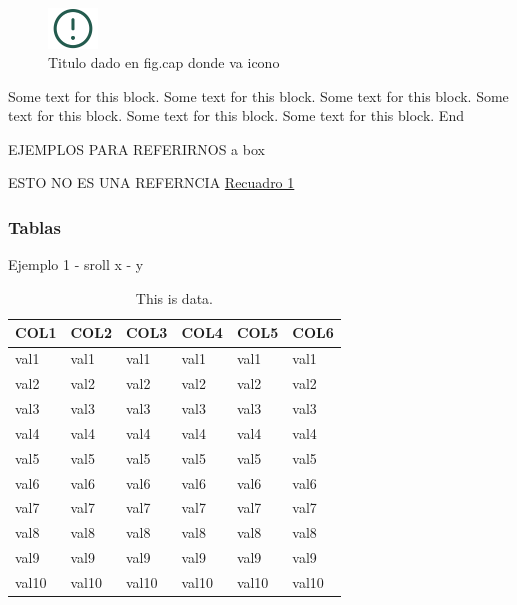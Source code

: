 \documentclass[
]{article}
\begin{document}
\begin{figure}
\includegraphics[width=50px,style="float:left; background-color: #fff; padding-right:1em"]{images-1/important-icon} \caption{Titulo dado en fig.cap donde va icono}\label{fig:testBox}
\end{figure}

\begin{rmdcomment}
Some text for this block. Some text for this block. Some text for this
block. Some text for this block. Some text for this block. Some text for
this block. End
\end{rmdcomment}

EJEMPLOS PARA REFERIRNOS a box

ESTO NO ES UNA REFERNCIA
\protect\hyperlink{fig:testBox}{Recuadro 1}

\hypertarget{tablas}{%
\subsubsection{Tablas}\label{tablas}}

Ejemplo 1 - sroll x - y

\begin{table}

\caption{\label{tab:unnamed-chunk-11}This is data.}
\centering
\fontsize{16}{18}\selectfont
\begin{tabu} to 
\hline
COL1 & COL2 & COL3 & COL4 & COL5 & COL6\\
\hline
val1 & val1 & val1 & val1 & val1 & val1\\
\hline
val2 & val2 & val2 & val2 & val2 & val2\\
\hline
val3 & val3 & val3 & val3 & val3 & val3\\
\hline
val4 & val4 & val4 & val4 & val4 & val4\\
\hline
val5 & val5 & val5 & val5 & val5 & val5\\
\hline
val6 & val6 & val6 & val6 & val6 & val6\\
\hline
val7 & val7 & val7 & val7 & val7 & val7\\
\hline
val8 & val8 & val8 & val8 & val8 & val8\\
\hline
val9 & val9 & val9 & val9 & val9 & val9\\
\hline
val10 & val10 & val10 & val10 & val10 & val10\\
\hline
\end{tabu}
\end{table}
\end{document}
